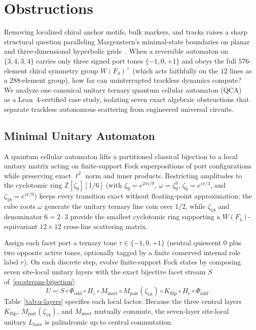 \section{Obstructions}
\label{sec:obstructions}

Removing localized chiral anchor motifs, bulk markers, and tracks raises a sharp structural question paralleling Margenstern's minimal-state boundaries on planar and three-dimensional hyperbolic grids~\cite{margenstern2018halting,margenstern2021outer,margenstern2023weighted,margenstern2024heptagrid}. When a reversible automaton on $\{3,4,3,4\}$ carries only three signed port tones $\{-1,0,+1\}$ and obeys the full $576$-element chiral symmetry group $W(F_4)^+$ (which acts faithfully on the $12$ lines as a $288$-element group), how far can uninterrupted trackless dynamics compute? We analyze one canonical unitary ternary quantum cellular automaton (QCA)~\cite{schumacher2004,arrighi2019} as a Lean~4-certified case study, isolating seven exact algebraic obstructions that separate trackless autonomous scattering from engineered universal circuits.

\subsection{Minimal Unitary Automaton}
\label{subsec:minimal-qca}

A quantum cellular automaton lifts a partitioned classical bijection to a local unitary matrix acting on finite-support Fock superpositions of port configurations while preserving exact $\ell^2$ norm and inner products. Restricting amplitudes to the cyclotomic ring $\mathbb{Z}[\zeta_9][1/6]$ (with $\zeta_9 = e^{2\pi i/9}$, $\omega = \zeta_9^3$, $\zeta_6 = e^{i\pi/3}$, and $\zeta_{18} = e^{i\pi/9}$) keeps every transition exact without floating-point approximation: the cube roots $\omega$ generate the unitary ternary line coin over $1/2$, while $\zeta_{18}$ and denominator $6 = 2 \cdot 3$ provide the smallest cyclotomic ring supporting a $W(F_4)$-equivariant $12 \times 12$ cross-line scattering matrix.

\begin{definition}
\label{def:bare-u}
Assign each facet port a ternary tone $\tau \in \{-1, 0, +1\}$ (neutral quiescent $0$ plus two opposite active tones, optionally tagged by a finite conserved internal role label $r$). On each discrete step, evolve finite-support Fock states by composing seven site-local unitary layers with the exact bijective facet stream $S$ of~\eqref{eq:stream-bijection}:
\begin{equation}
\label{eq:bare-u}
U = S \circ \Phi_{\mathrm{odd}} \circ H_c \circ M_{\mathrm{meet}} \circ M_{\mathrm{pair}}(\zeta_{18}) \circ K_{\mathrm{flip}} \circ H_c \circ \Phi_{\mathrm{odd}}.
\end{equation}
Table~\ref{tab:u-layers} specifies each local factor. Because the three central layers $K_{\mathrm{flip}}$, $M_{\mathrm{pair}}(\zeta_{18})$, and $M_{\mathrm{meet}}$ mutually commute, the seven-layer site-local unitary $L_{\mathrm{bare}}$ is palindromic up to central commutation.
\end{definition}

